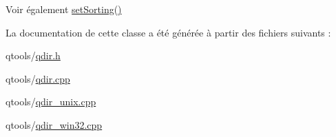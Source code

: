 \begin{DoxySeeAlso}{Voir également}
\hyperlink{class_q_dir_a65280d204cd65975953e3eb2a63da778}{set\+Sorting()} 
\end{DoxySeeAlso}


La documentation de cette classe a été générée à partir des fichiers suivants \+:\begin{DoxyCompactItemize}
\item 
qtools/\hyperlink{qdir_8h}{qdir.\+h}\item 
qtools/\hyperlink{qdir_8cpp}{qdir.\+cpp}\item 
qtools/\hyperlink{qdir__unix_8cpp}{qdir\+\_\+unix.\+cpp}\item 
qtools/\hyperlink{qdir__win32_8cpp}{qdir\+\_\+win32.\+cpp}\end{DoxyCompactItemize}
